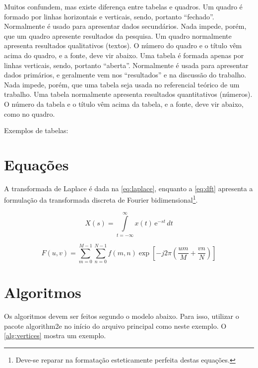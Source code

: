 

Muitos confundem, mas existe diferença entre tabelas e quadros.
Um quadro é formado por linhas horizontais e verticais,
sendo, portanto ``fechado''. Normalmente é usado
para apresentar dados secundários. Nada impede, porém,
que um quadro apresente resultados da pesquisa.
Um quadro normalmente apresenta resultados
qualitativos (textos). O número do quadro e o título
vêm acima do quadro, e a fonte, deve vir abaixo.
Uma tabela é formada apenas por linhas verticais, sendo,
portanto ``aberta''. Normalmente é usada para
apresentar dados primários, e geralmente vem nos
``resultados'' e na discussão do trabalho. Nada
impede, porém, que uma tabela seja usada no
referencial teórico de um trabalho. Uma tabela
normalmente apresenta resultados quantitativos
(números). O número da tabela e o título vêm
acima da tabela, e a fonte, deve vir abaixo, como
no quadro.

Exemplos de tabelas:





\section{Equações}
\label{sec:equacoes}

A transformada de Laplace é dada na \autoref{eq:laplace}, enquanto a \autoref{eq:dft} apresenta a formulação da transformada discreta de Fourier bidimensional\footnote{Deve-se reparar na formatação esteticamente perfeita destas equações.}.

\begin{equation}
    X(s) = \int\limits_{t = -\infty}^{\infty} x(t) \, \text{e}^{-st} \, dt
    \label{eq:laplace}
\end{equation}

\begin{equation}
    F(u, v) = \sum_{m = 0}^{M - 1} \sum_{n = 0}^{N - 1} f(m, n) \exp \left[ -j 2 \pi \left( \frac{u m}{M} + \frac{v n}{N} \right) \right]
    \label{eq:dft}
\end{equation}

\section{Algoritmos}\label{sec:algoritmos}

Os algoritmos devem ser feitos segundo o modelo abaixo.
Para isso, utilizar o pacote {\ttfamily algorithm2e} no início do arquivo principal como neste exemplo.
O \autoref{alg:vertices} mostra um exemplo.







